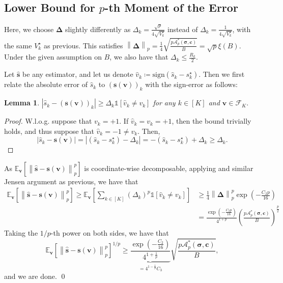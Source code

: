 \documentclass{article}
\def\vc{{\bm{c}}}
\def\vs{{\bm{s}}}
\def\vv{{\bm{v}}}
\def\gA{{\mathcal{A}}}
\def\gF{{\mathcal{F}}}
\newcommand{\E}{\mathbb{E}}
\theoremstyle{plain}
\newtheorem{lemma}[theorem]{Lemma}
\theoremstyle{definition}
\theoremstyle{plain}
\newcommand{\bignorm}[1]{\left\lVert #1 \right\rVert}
\newcommand{\indicator}{\mathds{1}}
\begin{document}
\subsection{\texorpdfstring{Lower Bound for $p$-th Moment of the Error}{Lower Bound for p-th Moment of the Error}}
Here, we choose $\bm\Delta$ slightly differently as $\Delta_k = \frac{\sqrt{p}}{4 \sqrt{V_k^\star}}$ instead of $\Delta_k = \frac{1}{4 \sqrt{V_k^\star}}$, with the same $V_k^\star$ as previous.
This satisfies $\bignorm{\bm\Delta}_p = \frac{1}{4} \sqrt{\frac{p \gA_p^*(\bm\sigma, \vc)}{B}} = \sqrt{p} \xi(B)$.
Under the given assumption on $B$, we also have that $\Delta_k \leq \frac{R_k}{2}$.

Let $\hat{\vs}$ be any estimator, and let us denote $\hat{v}_k \coloneq \mathrm{sign}(\hat{s}_k - s_k^\star)$.
Then we first relate the absolute error of $\hat{s}_k$ to $(\vs(\vv))_k$ with the sign-error as follows:
\begin{lemma}
\label{lem:sign-error}
    $\left| \hat{s}_k - (\vs(\vv))_k \right| \geq \Delta_k \indicator[\hat{v}_k \neq v_k]$ for any $k \in [K]$ and $\vv \in \gF_K.$
\end{lemma}
\begin{proof}
    W.l.o.g. suppose that $v_k = +1$.
    If $\hat{v}_k = v_k = +1$, then the bound trivially holds, and thus suppose that $\hat{v}_k = -1 \neq v_k$.
    Then,
    \begin{equation}
        \left| \hat{s}_k - \vs(\vv) \right| = \left| (\hat{s}_k - s_k^\star) - \Delta_k \right| = -(\hat{s}_k - s_k^\star) + \Delta_k \geq \Delta_k.
    \end{equation}
\end{proof}

As $\E_{\vv}\left[ \bignorm{\hat{\vs} - \vs(\vv)}_p^p \right]$ is coordinate-wise decomposable, applying  and similar Jensen argument as previous, we have that
\begin{align}
    \E_{\vv}\left[ \bignorm{\hat{\vs} - \vs(\vv)}_p^p \right] \geq \E_{\vv}\left[ \sum_{k \in [K]} (\Delta_k)^p \indicator[\hat{v}_k \neq v_k] \right]
    &\geq \frac{1}{4} \bignorm{\bm\Delta}_p^p \exp\left( -\frac{C_2 p}{16} \right) \\
    &= \frac{\exp\left( -\frac{C_2 p}{16} \right)}{4^{1+p}} \left( \frac{p \gA_p^*(\bm\sigma, \vc)}{B} \right)^{\frac{p}{2}}
\end{align}
Taking the $1/p$-th power on both sides, we have that
\begin{equation}
    \E_{\vv}\left[ \bignorm{\hat{\vs} - \vs(\vv)}_p^p \right]^{1/p} \geq \underbrace{\frac{\exp\left( -\frac{C_2}{16} \right)}{4^{1+\frac{1}{p}}}}_{= 4^{1 - \frac{1}{p}} C_3} \sqrt{\frac{p \gA_p^*(\bm\sigma, \vc)}{B}},
\end{equation}
and we are done.
\qed
\end{document}
